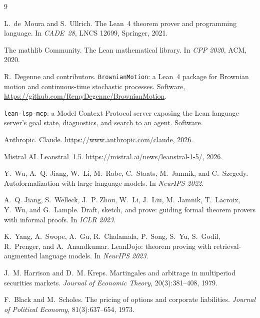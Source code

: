 \documentclass[11pt]{article}
\newcommand{\lean}[1]{\texttt{\def\_{\textunderscore\allowbreak}#1}}
\begin{document}
\begin{thebibliography}{9}

L.~de~Moura and S.~Ullrich.
\newblock The Lean~4 theorem prover and programming language.
\newblock In \emph{CADE~28}, LNCS 12699, Springer, 2021.

The mathlib Community.
\newblock The Lean mathematical library.
\newblock In \emph{CPP 2020}, ACM, 2020.

R.~Degenne and contributors.
\newblock \lean{BrownianMotion}: a Lean~4 package for Brownian motion and
  continuous-time stochastic processes.
\newblock Software, \url{https://github.com/RemyDegenne/BrownianMotion}.

\lean{lean-lsp-mcp}: a Model Context Protocol server exposing the Lean language
  server's goal state, diagnostics, and search to an agent.
\newblock Software.

Anthropic.
\newblock Claude.
\newblock \url{https://www.anthropic.com/claude}, 2026.

Mistral AI.
\newblock Leanstral~1.5.
\newblock \url{https://mistral.ai/news/leanstral-1-5/}, 2026.

Y.~Wu, A.~Q. Jiang, W.~Li, M.~Rabe, C.~Staats, M.~Jamnik, and C.~Szegedy.
\newblock Autoformalization with large language models.
\newblock In \emph{NeurIPS 2022}.

A.~Q. Jiang, S.~Welleck, J.~P. Zhou, W.~Li, J.~Liu, M.~Jamnik, T.~Lacroix,
  Y.~Wu, and G.~Lample.
\newblock Draft, sketch, and prove: guiding formal theorem provers with informal
  proofs.
\newblock In \emph{ICLR 2023}.

K.~Yang, A.~Swope, A.~Gu, R.~Chalamala, P.~Song, S.~Yu, S.~Godil, R.~Prenger,
  and A.~Anandkumar.
\newblock LeanDojo: theorem proving with retrieval-augmented language models.
\newblock In \emph{NeurIPS 2023}.

J.~M. Harrison and D.~M. Kreps.
\newblock Martingales and arbitrage in multiperiod securities markets.
\newblock \emph{Journal of Economic Theory}, 20(3):381--408, 1979.

F.~Black and M.~Scholes.
\newblock The pricing of options and corporate liabilities.
\newblock \emph{Journal of Political Economy}, 81(3):637--654, 1973.

\end{thebibliography}
\end{document}
